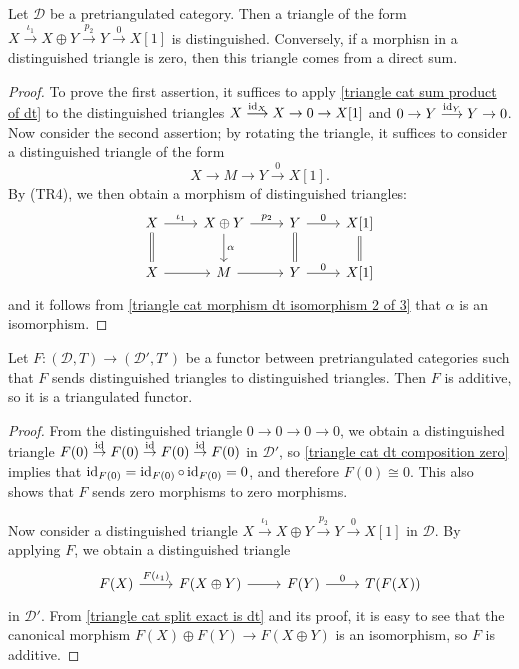 \begin{corollary}\label{triangle cat split exact is dt}
Let $\mathcal{D}$ be a pretriangulated category. Then a triangle of the form $X\stackrel{\iota_1}{\to} X\oplus Y\stackrel{p_2}{\to} Y\stackrel{0}{\to} X[1]$ is distinguished. Conversely, if a morphisn in a distinguished triangle is zero, then this triangle comes from a direct sum.
\end{corollary}
\begin{proof}
To prove the first assertion, it suffices to apply \cref{triangle cat sum product of dt} to the distinguished triangles $X\stackrel{\operatorname{id}_X}{\longrightarrow} X\to 0\to X[1]$ and $0\to Y\stackrel{\operatorname{id}_Y}{\longrightarrow} Y\to 0$. Now consider the second assertion; by rotating the triangle, it suffices to consider a distinguished triangle of the form
\[X\to M\to Y\stackrel{0}{\to} X[1].\]
By (TR4), we then obtain a morphism of distinguished triangles:
\[\begin{tikzcd}
X\ar[r,"\iota_1"]\ar[d,equal]&X\oplus Y\ar[d,"\alpha"]\ar[r,"p_2"]&Y\ar[r,"0"]\ar[d,equal]&X[1]\ar[d,equal]\\
X\ar[r]&M\ar[r]&Y\ar[r,"0"]&X[1]
\end{tikzcd}\]
and it follows from \cref{triangle cat morphism dt isomorphism 2 of 3} that $\alpha$ is an isomorphism.
\end{proof} 

\begin{corollary}\label{triangle cat functor is additive}
Let $F:(\mathcal{D},T)\to(\mathcal{D}',T')$ be a functor between pretriangulated categories such that $F$ sends distinguished triangles to distinguished triangles. Then $F$ is additive, so it is a triangulated functor.
\end{corollary}
\begin{proof}
From the distinguished triangle $0\to 0\to 0\to 0$, we obtain a distinguished triangle $F(0)\stackrel{\operatorname{id}}{\to} F(0)\stackrel{\operatorname{id}}{\to} F(0)\stackrel{\operatorname{id}}{\to} F(0)$ in $\mathcal{D}'$, so \cref{triangle cat dt composition zero} implies that $\operatorname{id}_{F(0)}=\operatorname{id}_{F(0)}\circ\operatorname{id}_{F(0)}=0$, and therefore $F(0)\cong 0$. This also shows that $F$ sends zero morphisms to zero morphisms.\par
Now consider a distinguished triangle $X\stackrel{\iota_1}{\to} X\oplus Y\stackrel{p_2}{\to} Y\stackrel{0}{\to} X[1]$ in $\mathcal{D}$. By applying $F$, we obtain a distinguished triangle
\[\begin{tikzcd}
F(X)\ar[r,"F(\iota_1)"]&F(X\oplus Y)\ar[r]&F(Y)\ar[r,"0"]&T(F(X))
\end{tikzcd}\]
in $\mathcal{D}'$. From \cref{triangle cat split exact is dt} and its proof, it is easy to see that the canonical morphism $F(X)\oplus F(Y)\to F(X\oplus Y)$ is an isomorphism, so $F$ is additive.
\end{proof}

